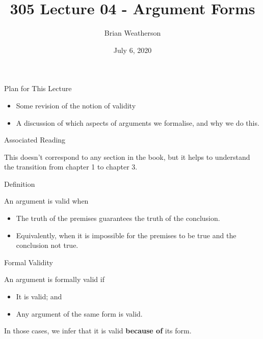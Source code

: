 \documentclass[
  ignorenonframetext,
]{beamer}
\title{305 Lecture 04 - Argument Forms}
\author{Brian Weatherson}
\date{July 6, 2020}
\providecommand{\tightlist}{%
  \setlength{\itemsep}{0pt}\setlength{\parskip}{0pt}}
\renewcommand{\,}{\text{, }}
\begin{document}
\frame{\titlepage}

\begin{frame}{Plan for This Lecture}
\protect\hypertarget{plan-for-this-lecture}{}

\begin{itemize}
\tightlist
\item
  Some revision of the notion of validity
\item
  A discussion of which aspects of arguments we formalise, and why we do
  this.
\end{itemize}

\end{frame}

\begin{frame}{Associated Reading}
\protect\hypertarget{associated-reading}{}

This doesn't correspond to any section in the book, but it helps to
understand the transition from chapter 1 to chapter 3.

\end{frame}

\begin{frame}{Definition}
\protect\hypertarget{definition}{}

An argument is valid when

\begin{itemize}
\tightlist
\item
  The truth of the premises guarantees the truth of the conclusion.
\item
  Equivalently, when it is impossible for the premises to be true and
  the conclusion not true.
\end{itemize}

\end{frame}

\begin{frame}{Formal Validity}
\protect\hypertarget{formal-validity}{}

An argument is formally valid if

\begin{itemize}
\tightlist
\item
  It is valid; and
\item
  Any argument of the same form is valid.
\end{itemize}

In those cases, we infer that it is valid \textbf{because of} its form.

\end{frame}
\end{document}
